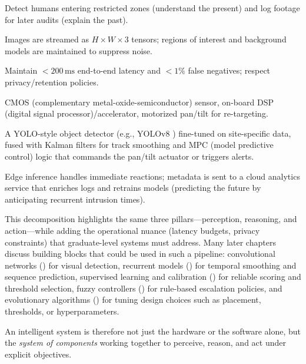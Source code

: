 \begin{tcolorbox}[summarybox, title={Checklist instantiated for the camera system}]
\begin{description}[style=nextline]
    \item[Problem + value role] Detect humans entering restricted zones (understand the present) and log footage for later audits (explain the past).
    \item[Representation] Images are streamed as \(H\times W\times 3\) tensors; regions of interest and background models are maintained to suppress noise.
    \item[Objectives/constraints] Maintain $<200\,\si{\milli\second}$ end-to-end latency and $<1\%$ false negatives; respect privacy/retention policies.
    \item[Hardware (perception/action)] CMOS (complementary metal-oxide-semiconductor) sensor, on-board DSP (digital signal processor)/accelerator, motorized pan/tilt for re-targeting.
    \item[Software (reasoning)] A YOLO-style object detector (e.g., YOLOv8 \citep{Jocher2023UltralyticsYOLOv8}) fine-tuned on site-specific data, fused with Kalman filters for track smoothing and MPC (model predictive control) logic that commands the pan/tilt actuator or triggers alerts.
    \item[Integration] Edge inference handles immediate reactions; metadata is sent to a cloud analytics service that enriches logs and retrains models (predicting the future by anticipating recurrent intrusion times).
\end{description}
\end{tcolorbox}

This decomposition highlights the same three pillars---perception, reasoning, and action---while adding the operational nuance (latency budgets, privacy constraints) that graduate-level systems must address. Many later chapters discuss building blocks that could be used in such a pipeline: convolutional networks () for visual detection, recurrent models () for temporal smoothing and sequence prediction, supervised learning and calibration () for reliable scoring and threshold selection, fuzzy controllers () for rule-based escalation policies, and evolutionary algorithms () for tuning design choices such as placement, thresholds, or hyperparameters.

An intelligent system is therefore not just the hardware or the software alone, but the \emph{system of components} working together to perceive, reason, and act under explicit objectives.

